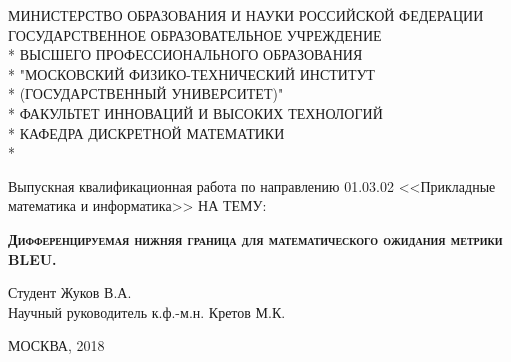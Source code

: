 \documentclass[14pt, a4paper]{extarticle}
\begin{document}
\begin{titlepage}
  \newpage
  
  \begin{center}
  МИНИСТЕРСТВО ОБРАЗОВАНИЯ И НАУКИ РОССИЙСКОЙ ФЕДЕРАЦИИ \\
  \vspace{0.5cm}
  ГОСУДАРСТВЕННОЕ ОБРАЗОВАТЕЛЬНОЕ УЧРЕЖДЕНИЕ \\*
  ВЫСШЕГО ПРОФЕССИОНАЛЬНОГО ОБРАЗОВАНИЯ\\*
  "МОСКОВСКИЙ ФИЗИКО-ТЕХНИЧЕСКИЙ ИНСТИТУТ \\*
  (ГОСУДАРСТВЕННЫЙ УНИВЕРСИТЕТ)" \\*
  \vspace{0.5cm}
  ФАКУЛЬТЕТ ИННОВАЦИЙ И ВЫСОКИХ ТЕХНОЛОГИЙ \\*
  КАФЕДРА ДИСКРЕТНОЙ МАТЕМАТИКИ \\*
  \hrulefill
  \end{center}
  
  
  \vspace{3em}
  
  \begin{center}
  \Large Выпускная квалификационная работа по направлению 01.03.02 <<Прикладные математика и информатика>> \linebreak НА ТЕМУ:
  \end{center}
  
  \vspace{2.5em}
  
  \begin{center}
  \textsc{\large{\textbf{Дифференцируемая нижняя граница для математического ожидания метрики BLEU.}}}
  \end{center}
  
  \vspace{6.5em}
  
  \begin{flushleft}
  Студент \hrulefill Жуков В.А. \\
  \vspace{1.5em}
  Научный руководитель к.ф.-м.н. \hrulefill Кретов М.К.\\
  \vspace{1.5em}
  \end{flushleft}
  
  \vspace{\fill}
  
  \begin{center}
  МОСКВА, 2018
  \end{center}
  
\end{titlepage}
\tableofcontents
\newpage
\end{document}
